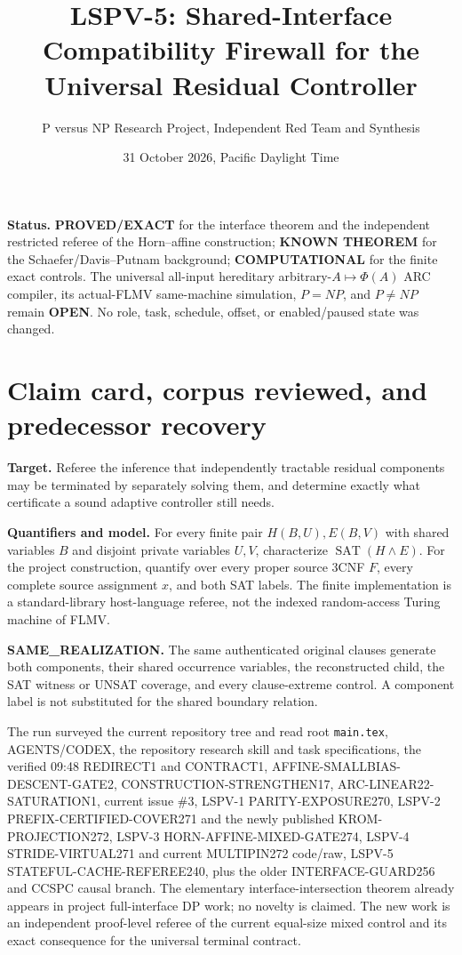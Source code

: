 \documentclass[11pt]{article}
\title{LSPV-5: Shared-Interface Compatibility Firewall for the Universal Residual Controller}
\author{P versus NP Research Project, Independent Red Team and Synthesis}
\date{31 October 2026, Pacific Daylight Time}
\begin{document}
\maketitle

\noindent\textbf{Status.}
\textbf{PROVED/EXACT} for the interface theorem and the independent restricted
referee of the Horn--affine construction; \textbf{KNOWN THEOREM} for the
Schaefer/Davis--Putnam background; \textbf{COMPUTATIONAL} for the finite exact
controls.  The universal all-input hereditary arbitrary-$A\mapsto\Phi(A)$
ARC compiler, its actual-FLMV same-machine simulation, $P=NP$, and $P\ne NP$
remain \textbf{OPEN}.  No role, task, schedule, offset, or enabled/paused state
was changed.

\section{Claim card, corpus reviewed, and predecessor recovery}
\textbf{Target.} Referee the inference that independently tractable residual
components may be terminated by separately solving them, and determine exactly
what certificate a sound adaptive controller still needs.

\textbf{Quantifiers and model.} For every finite pair $H(B,U),E(B,V)$ with
shared variables $B$ and disjoint private variables $U,V$, characterize
$\operatorname{SAT}(H\wedge E)$.  For the project construction, quantify over
every proper source 3CNF $F$, every complete source assignment $x$, and both
SAT labels.  The finite implementation is a standard-library host-language
referee, not the indexed random-access Turing machine of FLMV.

\textbf{SAME\_REALIZATION.} The same authenticated original clauses generate
both components, their shared occurrence variables, the reconstructed child,
the SAT witness or UNSAT coverage, and every clause-extreme control.  A component
label is not substituted for the shared boundary relation.

The run surveyed the current repository tree and read root \texttt{main.tex},
AGENTS/CODEX, the repository research skill and task specifications, the
verified 09:48 REDIRECT1 and CONTRACT1, AFFINE-SMALLBIAS-DESCENT-GATE2,
CONSTRUCTION-STRENGTHEN17, ARC-LINEAR22-SATURATION1, current issue \#3,
LSPV-1 PARITY-EXPOSURE270, LSPV-2 PREFIX-CERTIFIED-COVER271 and the newly
published KROM-PROJECTION272, LSPV-3 HORN-AFFINE-MIXED-GATE274, LSPV-4
STRIDE-VIRTUAL271 and current MULTIPIN272 code/raw, LSPV-5
STATEFUL-CACHE-REFEREE240, plus the older INTERFACE-GUARD256 and CCSPC causal
branch.  The elementary interface-intersection theorem already appears in
project full-interface DP work; no novelty is claimed.  The new work is an
independent proof-level referee of the current equal-size mixed control and its
exact consequence for the universal terminal contract.
\end{document}
